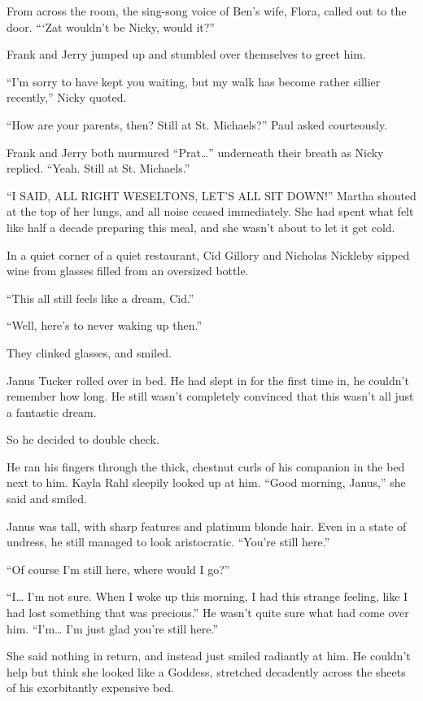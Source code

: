 From across the room, the sing-song voice of Ben’s wife, Flora, called out to the door. “‘Zat wouldn’t be Nicky, would it?”

Frank and Jerry jumped up and stumbled over themselves to greet him.

“I’m sorry to have kept you waiting, but my walk has become rather sillier recently,” Nicky quoted.

“How are your parents, then? Still at St. Michaels?” Paul asked courteously.

Frank and Jerry both murmured “Prat…” underneath their breath as Nicky replied. “Yeah. Still at St. Michaels.”

“I SAID, ALL RIGHT WESELTONS, LET’S ALL SIT DOWN!” Martha shouted at the top of her lungs, and all noise ceased immediately. She had spent what felt like half a decade preparing this meal, and she wasn’t about to let it get cold.
\simpleline

In a quiet corner of a quiet restaurant, Cid Gillory and Nicholas Nickleby sipped wine from glasses filled from an oversized bottle.

“This all still feels like a dream, Cid.”

“Well, here’s to never waking up then.”

They clinked glasses, and smiled.
\simpleline

Janus Tucker rolled over in bed. He had slept in for the first time in, he couldn’t remember how long. He still wasn’t completely convinced that this wasn’t all just a fantastic dream.

So he decided to double check.

He ran his fingers through the thick, chestnut curls of his companion in the bed next to him. Kayla Rahl sleepily looked up at him. “Good morning, Janus,” she said and smiled.

Janus was tall, with sharp features and platinum blonde hair. Even in a state of undress, he still managed to look aristocratic. “You’re still here.”

“Of course I’m still here, where would I go?”

“I… I’m not sure. When I woke up this morning, I had this strange feeling, like I had lost something that was precious.” He wasn’t quite sure what had come over him. “I’m… I’m just glad you’re still here.”

She said nothing in return, and instead just smiled radiantly at him. He couldn’t help but think she looked like a Goddess, stretched decadently across the sheets of his exorbitantly expensive bed.


